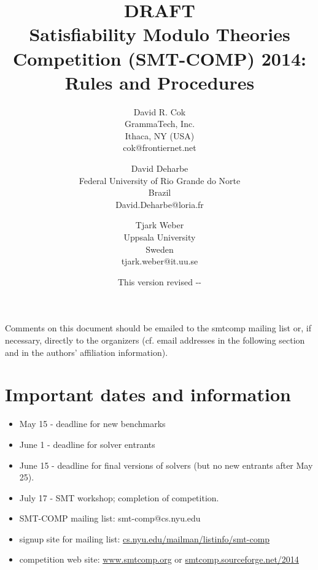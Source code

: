 \documentclass[12pt]{article}
\begin{document}
\date{\small This version revised \the\year-\the\month-\the\day}

\title{DRAFT\\Satisfiability Modulo Theories Competition (SMT-COMP) 2014: Rules and 
Procedures}


\def\doauthor#1{{%
  \hsize.5\hsize \advance\hsize by-1cm %
  \def\\{\hss\egroup\hbox to\hsize\bgroup\strut\hss}%
  \vbox{\hbox to\hsize\bgroup\strut\hss#1\hss\egroup}}}%

\def\header#1{\medskip\noindent\textbf{#1}}

\author{
David R. Cok \\
GrammaTech, Inc. \\
Ithaca, NY (USA) \\
cok@frontiernet.net \\
\and
David Deharbe \\
Federal University of Rio Grande do Norte \\
Brazil \\
David.Deharbe@loria.fr \\
\and
Tjark Weber \\
Uppsala University \\
Sweden \\
tjark.weber@it.uu.se \\ 
}



\maketitle

\def\eg{\textit{e.g.}}
\def\ie{\textit{i.e.}}

\noindent Comments on this document should be emailed to the smtcomp mailing
list or, if necessary, directly to the organizers (cf. email addresses in the following section and in the authors' affiliation information).

\section{Important dates and information}
\begin{itemize}
\item May 15 - deadline for new benchmarks
\item June 1 - deadline for solver entrants
\item June 15 - deadline for final versions of solvers (but no new entrants after May 25).
\item July 17 - SMT workshop; completion of competition.
\item SMT-COMP mailing list: smt-comp@cs.nyu.edu
\item signup site for mailing list: \url{cs.nyu.edu/mailman/listinfo/smt-comp}
\item competition web site: \url{www.smtcomp.org}  or \url{smtcomp.sourceforge.net/2014}
\end{itemize}
\end{document}
